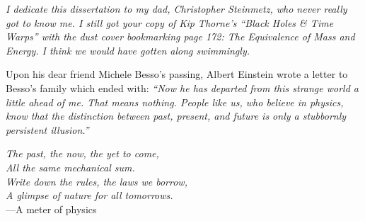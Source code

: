 {
\itshape
I dedicate this dissertation to my dad, Christopher Steinmetz, who never really got to know me. I still got your copy of Kip Thorne's ``Black Holes \& Time Warps'' with the dust cover bookmarking page 172: The Equivalence of Mass and Energy. I think we would have gotten along swimmingly.
}

\vfill

{
\noindent Upon his dear friend Michele Besso's passing, Albert Einstein wrote a letter to Besso's family which ended with:
\centering\itshape
``Now he has departed from this strange world a little ahead of me. That means nothing. People like us, who believe in physics, know that the distinction between past, present, and future is only a stubbornly persistent illusion.''
}

\vfill

{
\centering\emph{
    The past, the now, the yet to come,\\
    All the same mechanical sum.\\
    Write down the rules, the laws we borrow,\\
    A glimpse of nature for all tomorrows.\\
}
---A meter of physics\,\\
}

